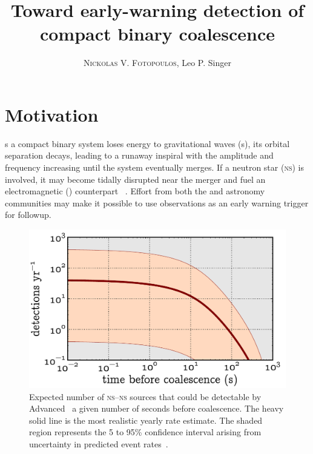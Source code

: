 \documentclass[portrait,plainboxedsections]{sciposter}
\title{Toward early-warning detection of compact binary coalescence}
\author{\textsc{Nickolas V. Fotopoulos}, Leo P. Singer}
\institute{LIGO Laboratory, California Institute of Technology}
\begin{document}

\maketitle

\begin{minipage}[t]{0.25\textwidth}

\section*{Motivation}

s a compact binary system loses energy to gravitational waves (\GW{}s), its
orbital separation decays, leading to a runaway inspiral with the \GW{}
amplitude and frequency increasing until the system eventually merges.  If a
neutron star (\textsc{ns}) is involved, it may become tidally disrupted near
the merger and fuel an electromagnetic (\EM{}) counterpart~%
\cite{shibata:2007}.  Effort from both the \GW{} and astronomy communities may make it
possible to use \GW{} observations as an early warning trigger for \EM{}
followup.
%
\begin{figure}[h]
\includegraphics[width=\textwidth]{figures/snr_in_time}
\caption{\label{fig:earlywarning}Expected number of \textsc{ns}--\textsc{ns}
sources that could be detectable by Advanced \LIGO\ a given number of seconds
before coalescence.  The heavy solid line is the most realistic yearly rate
estimate.  The shaded region represents the 5 to 95\% confidence interval
arising from uncertainty in predicted event rates~\cite{Abadie:2010p10836}.}
\end{figure}
%
\begin{figure}[h]

\end{figure}
\end{minipage}
\end{document}
